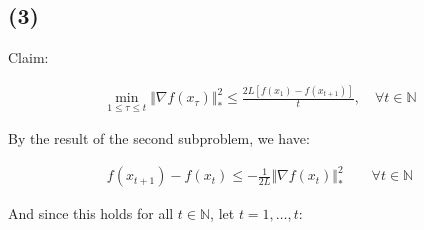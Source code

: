 \documentclass{article}
\begin{document}

\subsection*{(3)}

Claim:

\begin{align*}
    \min_{1 \leq \tau \leq t} \Vert \nabla f ( x_\tau ) \Vert_*^2 \leq \frac{ 2 L \left[ f ( x_1 ) - f ( x_{t + 1} ) \right] }{t} , \quad \forall t \in \mathbb{N}
\end{align*}

By the result of the second subproblem, we have:

\begin{align*}
    f ( x_{t + 1} ) - f ( x_t ) \leq -\frac{1}{2L} \Vert \nabla f ( x_t ) \Vert_*^2 \qquad \forall t \in \mathbb{N}
\end{align*}

And since this holds for all $t \in \mathbb{N}$, let $t = 1, \dots, t$:
\end{document}
